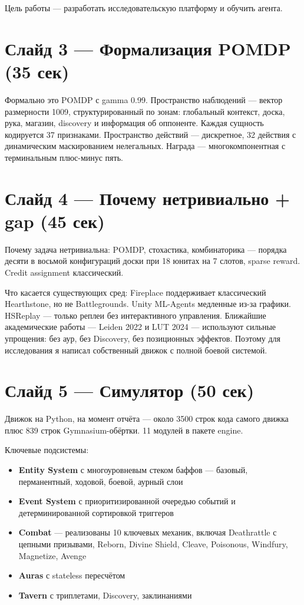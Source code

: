 \documentclass[a4paper,12pt]{extarticle}
\begin{document}
Цель работы --- разработать исследовательскую платформу и обучить агента.

\section*{Слайд 3 --- Формализация POMDP (35 сек)}

Формально это POMDP с gamma 0.99. Пространство наблюдений --- вектор размерности 1009, структурированный по зонам: глобальный контекст, доска, рука, магазин, discovery и информация об оппоненте. Каждая сущность кодируется 37 признаками. Пространство действий --- дискретное, 32 действия с динамическим маскированием нелегальных. Награда --- многокомпонентная с терминальным плюс-минус пять.

\section*{Слайд 4 --- Почему нетривиально + gap (45 сек)}

Почему задача нетривиальна: POMDP, стохастика, комбинаторика --- порядка десяти в восьмой конфигураций доски при 18 юнитах на 7 слотов, sparse reward. Credit assignment классический.

Что касается существующих сред: Fireplace поддерживает классический Hearthstone, но не Battlegrounds. Unity ML-Agents медленные из-за графики. HSReplay --- только реплеи без интерактивного управления. Ближайшие академические работы --- Leiden 2022 и LUT 2024 --- используют сильные упрощения: без аур, без Discovery, без позиционных эффектов. Поэтому для исследования я написал собственный движок с полной боевой системой.

\section*{Слайд 5 --- Симулятор (50 сек)}

Движок на Python, на момент отчёта --- около 3500 строк кода самого движка плюс 839 строк Gymnasium-обёртки. 11 модулей в пакете engine.

Ключевые подсистемы:
\begin{itemize}[noitemsep]
  \item \textbf{Entity System} с многоуровневым стеком баффов --- базовый, перманентный, ходовой, боевой, аурный слои
  \item \textbf{Event System} с приоритизированной очередью событий и детерминированной сортировкой триггеров
  \item \textbf{Combat} --- реализованы 10 ключевых механик, включая Deathrattle с цепными призывами, Reborn, Divine Shield, Cleave, Poisonous, Windfury, Magnetize, Avenge
  \item \textbf{Auras} с stateless пересчётом
  \item \textbf{Tavern} с триплетами, Discovery, заклинаниями
\end{itemize}
\end{document}
